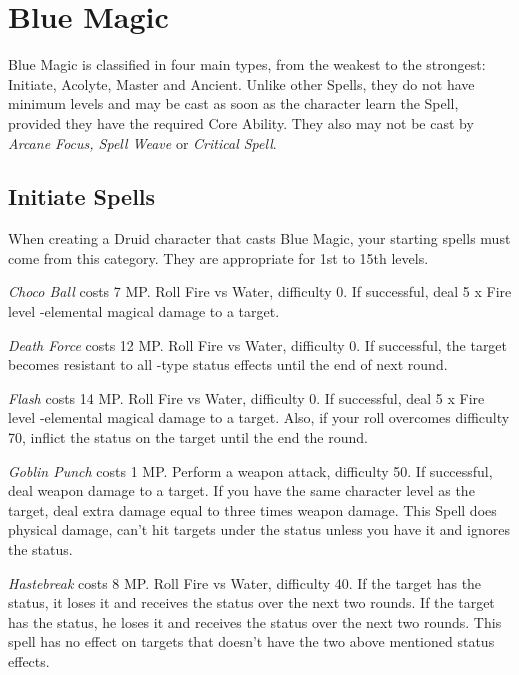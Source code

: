 \section{Blue Magic}\label{sec:magic-blue}
\begin{multicols}{2}

Blue Magic is classified in four main types, from the weakest to the strongest: Initiate, Acolyte, Master and Ancient. Unlike other Spells, they do not have minimum levels and may be cast as soon as the character learn the Spell, provided they have the required Core Ability. They also may not be cast by \textit{Arcane Focus, Spell Weave} or \textit{Critical Spell}.
 
\subsection{Initiate Spells}\label{subsec:blue-initiate}
	When creating a Druid character that casts Blue Magic, your starting spells must come from this category. They are appropriate for 1st to 15th levels.

    \textit{Choco Ball} costs 7 MP\@. Roll Fire vs Water, difficulty 0. If successful, deal 5 x Fire level -elemental magical damage to a target.

    \textit{Death Force} costs 12 MP\@. Roll Fire vs Water, difficulty 0. If successful, the target becomes resistant to all -type status effects until the end of next round.

	\textit{Flash} costs 14 MP\@. Roll Fire vs Water, difficulty 0. If successful, deal 5 x Fire level -elemental magical damage to a target. Also, if your roll overcomes difficulty 70, inflict the  status on the target until the end the round.
	
    \textit{Goblin Punch} costs 1 MP\@. Perform a weapon attack, difficulty 50. If successful, deal weapon damage to a target. If you have the same character level as the target, deal extra damage equal to three times weapon damage. This Spell does physical damage, can’t hit targets under the  status unless you have it and ignores the  status.

    \textit{Hastebreak} costs 8 MP\@. Roll Fire vs Water, difficulty 40. If the target has the  status, it loses it and receives the  status over the next two rounds. If the target has the  status, he loses it and receives the  status over the next two rounds. This spell has no effect on targets that doesn’t have the two above mentioned status effects.
    

\end{multicols}
